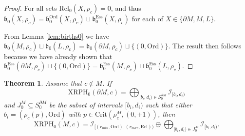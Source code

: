 \documentclass[a4paper,11pt]{article}
\newtheorem{theorem}{Theorem}[section]
\theoremstyle{definition}
\newcommand{\Rel}{\textrm{Rel}}
\newcommand{\Ord}{\textrm{Ord}}
\newcommand{\Ess}{\textrm{Ess}}
\newcommand{\birth}{\mathfrak{b}}
\begin{document}
\begin{proof}
For all sets $\Rel_0(X, \rho_c)=0$, and thus $\birth_0(X, \rho_c)=\birth_0^{\Ord}(X, \rho_c) \sqcup \birth_0^{\Ess}(X, \rho_c)$ for each of $X\in \{\partial M, M, L\}$.

From Lemma \ref{lem:births0} we have
$\mathfrak{b}_0(M,\rho_c)\sqcup  \mathfrak{b}_0(L,\rho_c)= \mathfrak{b}_0(\partial M,\rho_c)\sqcup \{(0,\text{Ord})\}$. The result then follows because we have already shown that $\mathfrak{b}_0^{\Ess}(\partial M,\rho_c) \sqcup \{(0, \Ord)\}=\mathfrak{b}_0^{\Ess}(M,\rho_c)\sqcup \mathfrak{b}_0^{\Ess}(L,\rho_c).$


\end{proof}


\begin{theorem}
Assume that $c\notin M$. If $$\text{XRPH}_0(\partial M,c) = \bigoplus_{[b_i,d_i)\in {S_0^{\partial M}}} \mathcal{I}_{[b_i,d_i)}$$ and $J_0^M\subseteq S_0^{\partial M}$ be the subset of intervals $[b_i,d_i)$ such that  either $b_i = (\rho_c(p),\text{Ord})$ with $p\in\text{Crit}(\rho_c^M,(0,+1))$,
then $$\text{XRPH}_0(M,c) = \mathcal{I}_{[(r_{min}, \text{Ord}), (r_{max}, \text{Rel}))}\oplus \bigoplus_{[b_i,d_i)\in J^M_0} \mathcal{I}_{[b_i,d_i)}.$$
\end{theorem}
\end{document}
